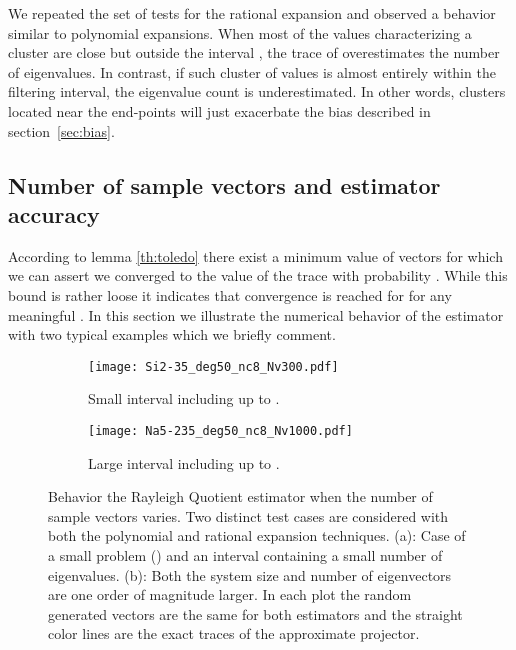 \documentclass[12pt]{article}		\usepackage{tabls,multirow}
\begin{document}
We repeated the set of tests for the rational expansion and observed a
behavior similar to polynomial expansions. When most of the values
characterizing a cluster are close but outside the interval ,
the trace of  overestimates the number of
eigenvalues. In contrast, if such cluster of values is almost entirely
within the filtering interval, the eigenvalue count is underestimated.
In other words, clusters located near the end-points will just
exacerbate the bias described in section~\ref{sec:bias}.



\subsection{Number of sample vectors and estimator accuracy}
\label{sec:vectrace}
According to lemma \ref{th:toledo} there exist a minimum value
of vectors for which we can assert we converged to the value of the
trace with probability . While this bound is rather loose it
indicates that convergence is reached for  for any meaningful . In this section we
illustrate the numerical behavior of the estimator with two typical
examples which we briefly comment.
\begin{figure}[!hbt]
\centering
  \begin{subfigure}[b]{0.495\textwidth}
                \centering
                \texttt{[image: Si2-35\_deg50\_nc8\_Nv300.pdf]}
                \caption{Small interval  including  
                    up to .}
                \label{fig:intrv1}
  \end{subfigure}
  \begin{subfigure}[b]{0.495\textwidth}
                \centering
                \texttt{[image: Na5-235\_deg50\_nc8\_Nv1000.pdf]}
                \caption{Large interval  including  up to
                    .}
                \label{fig:intrv2}
  \end{subfigure}
  \caption{Behavior the Rayleigh Quotient estimator when
     the number of sample vectors  varies. Two distinct test cases
 are considered with 
 both the polynomial and rational expansion techniques.
 (a):  Case of a small problem
 () and an interval containing a small number of
  eigenvalues.   (b): Both the system size and number of
  eigenvectors are one order of magnitude larger. In each plot the
  random generated vectors are the same for both estimators and the
  straight color lines are the exact traces of the approximate
  projector.}
  \label{fig:estvsNv}
\end{figure}
\end{document}
